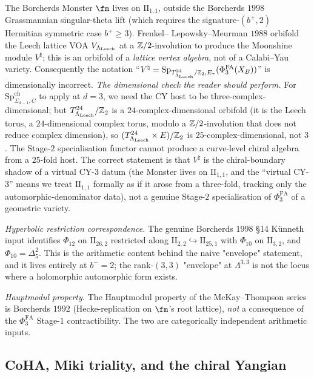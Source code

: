 \begin{theorem}
The Borcherds Monster $\fm$ lives on $\mathrm{II}_{1,1}$, outside the
Borcherds $1998$ Grassmannian singular-theta lift (which requires the
signature-$(b^+, 2)$ Hermitian symmetric case $b^+ \geq 3$). Frenkel--
Lepowsky--Meurman $1988$ orbifold the Leech lattice VOA
$V_{\Lambda_{\mathrm{Leech}}}$ at a $\mathbb{Z}/2$-involution to produce the Moonshine module
$V^\natural$; this is an orbifold of a \emph{lattice vertex algebra},
not of a Calabi--Yau variety. Consequently the notation
``$V^\natural = \mathrm{Sp}_{T^{24}_{\Lambda_{\mathrm{Leech}}}/\mathbb{Z}_2, E_\tau}
(\Phi^{\mathrm{FA}}_3(X_B))$'' is dimensionally incorrect.
\emph{The dimensional check the reader should perform.} For
$\mathrm{Sp}^{\mathrm{ch}}_{\Sigma_{d-1}, C}$ to apply at $d = 3$,
we need the CY host to be three-complex-dimensional; but
$T^{24}_{\Lambda_{\mathrm{Leech}}}/\mathbb{Z}_2$ is a $24$-complex-dimensional orbifold (it is
the Leech torus, a $24$-dimensional complex torus, modulo a
$\mathbb{Z}/2$-involution that does not reduce complex dimension), so
$(T^{24}_{\Lambda_{\mathrm{Leech}}} \times E)/\mathbb{Z}_2$ is $25$-complex-dimensional, not
$3$. The Stage-$2$ specialisation functor cannot produce a curve-level
chiral algebra from a $25$-fold host. The correct statement is that
$V^\natural$ is the chiral-boundary shadow of a virtual CY-$3$ datum
(the Monster lives on $\mathrm{II}_{1,1}$, and the ``virtual CY-$3$''
means we treat $\mathrm{II}_{1,1}$ formally as if it arose from a
three-fold, tracking only the automorphic-denominator data), not a
genuine Stage-$2$ specialisation of $\Phi^{\mathrm{FA}}_3$ of a
geometric variety.

\emph{Hyperbolic restriction correspondence.} The genuine Borcherds
$1998$ \S 14 K\"unneth input identifies $\Phi_{12}$ on
$\mathrm{II}_{26,2}$ restricted along
$\mathrm{II}_{2,2} \hookrightarrow \mathrm{II}_{25,1}$ with $\Phi_{10}$
on $\mathrm{II}_{3,2}$, and $\Phi_{10} = \Delta_5^2$. This is the
arithmetic content behind the naive "envelope" statement, and it lives
entirely at $b^- = 2$; the rank-$(3,3)$ "envelope" at $\Lambda^{3,3}$
is not the locus where a holomorphic automorphic form exists.

\emph{Hauptmodul property.} The Hauptmodul property of the
McKay--Thompson series is Borcherds $1992$ (Hecke-replication on
$\fm$'s root lattice), \emph{not} a consequence of the
$\Phi^{\mathrm{FA}}_3$ Stage-$1$ contractibility. The two are
categorically independent arithmetic inputs.
\end{theorem}

\subsection{CoHA, Miki triality, and the chiral Yangian}
\label{wn:subsec:spine-CoHA-Miki}

